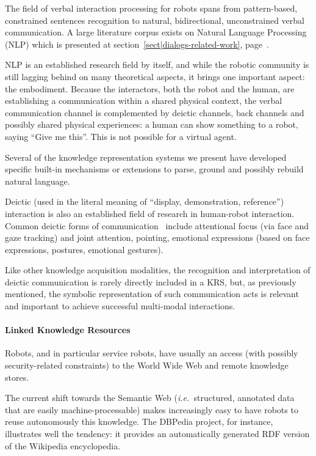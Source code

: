 \documentclass[a4paper, twocolumn]{article}
\newcommand{\ie}{{\textit{i.e.\ }}}
\begin{document}
\label{sect|nlp}

The field of verbal interaction processing for robots spans from pattern-based,
constrained sentences recognition to natural, bidirectional, unconstrained
verbal communication. A large literature corpus exists on Natural Language
Processing (NLP) which is presented at section~\ref{sect|dialogs-related-work},
page~\pageref{sect|dialogs-related-work}.

NLP is an established research field by itself, and while the robotic community
is still lagging behind on many theoretical aspects, it brings one important
aspect: the embodiment. Because the interactors, both the robot and the human,
are establishing a communication within a shared physical context, the verbal
communication channel is complemented by deictic channels, back channels and
possibly shared physical experiences: a human can show something to a robot,
saying ``Give me this''. This is not possible for a virtual agent.

Several of the knowledge representation systems we present have developed
specific built-in mechanisms or extensions to parse, ground and possibly
rebuild natural language.

Deictic (used in the literal meaning of ``display, demonstration, reference'')
interaction is also an established field of research in human-robot
interaction. Common deictic forms of communication~\cite{Li2012} include
attentional focus (via face and gaze tracking) and joint attention, pointing,
emotional expressions (based on face expressions, postures, emotional
gestures).

Like other knowledge acquisition modalities, the recognition and interpretation
of deictic communication is rarely directly included in a KRS, but, as
previously mentioned, the symbolic representation of such communication acts is
relevant and important to achieve successful multi-modal interactions.

\paragraph{Linked Knowledge Resources}
\label{sect|lod}

Robots, and in particular service robots, have usually an access (with possibly
security-related constraints) to the World Wide Web and remote knowledge stores.

The current shift towards the Semantic Web (\ie structured, annotated data that
are easily machine-processable) makes increasingly easy to have robots to reuse
autonomously this knowledge. The DBPedia project, for instance, illustrates
well the tendency: it provides an automatically generated RDF version of the
Wikipedia encyclopedia.
\end{document}
